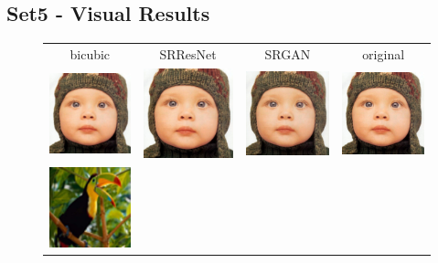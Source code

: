 \documentclass[10pt,twocolumn,letterpaper]{article}
\begin{document}
\subsection{Set5 - Visual Results}
\label{app:Set5}
\begin{figure}[h!]
\begin{tabular}{cccc}
bicubic & SRResNet & SRGAN & original \\
\includegraphics[width=1.4in]{images/used/appendix/jpg/Set5/baby_bicubic}&
\includegraphics[width=1.4in]{images/used/appendix/jpg/Set5/baby_SRResNet-MSE} &
\includegraphics[width=1.4in]{images/used/appendix/jpg/Set5/baby_SRGAN-VGG54} &
\includegraphics[width=1.4in]{images/used/appendix/jpg/Set5/baby_HR} \\
\includegraphics[width=1.4in]{images/used/appendix/jpg/Set5/bird_bicubic}&

\end{tabular}
\end{figure}
\end{document}
